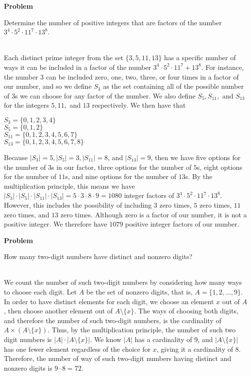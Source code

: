 \documentclass[12pt]{article}
\newcounter{problem}[section]
\newenvironment{problem}[1][]
{\refstepcounter{problem}\noindent\textbf{Problem~\theproblem #1}\vspace{0.2cm}\\\begin{lrbox}{\mybox}\begin{minipage}{\textwidth}}
{\end{minipage}\end{lrbox}\fbox{\usebox{\mybox}}}
\newenvironment{solution}{\vspace{0.1cm}\\}{\vspace{0.5cm}}
\begin{document}
\begin{problem}
    Determine the number of positive integers that are factors of the number $3^4 \cdot 5^2 \cdot 11^7 \cdot 13^8$. 
\end{problem}
\begin{solution}
\noindent Each distinct prime integer from the set $\{3,5,11,13\}$ has a specific number of ways it can be included in a factor of the number $3^4 \cdot 5^2 \cdot 11^7 + 13^8$. For instance, the number $3$ can be included zero, one, two, three, or four times in a factor of our number, and so we define $S_{3}$ as the set containing all of the possible number of $3$s we can choose for any factor of the number. We also define $S_{5}, S_{11},$ and $S_{13}$ for the integers $5, 11,$ and $13$ respectively. We then have that
\begin{center}
    $S_{3} = \{0,1,2,3,4\}$\\
    $S_{5} = \{0,1,2\}$\\
    $S_{11} = \{0,1,2,3,4,5,6,7\}$\\
    $S_{13} = \{0,1,2,3,4,5,6,7,8\}$
\end{center}
\noindent Because $|S_{3}| = 5, |S_{5}|=3, |S_{11}| = 8$, and $|S_{13}| = 9$, then we have five options for the number of $3$s in our factor, three options for the number of $5$s, eight options for the number of $11$s, and nine options for the number of $13$s. By the multiplication principle, this means we have $|S_{3}|\cdot |S_{5}| \cdot |S_{11}| \cdot |S_{13}| = 5 \cdot 3 \cdot 8 \cdot 9 = 1080$ integer factors of $3^4 \cdot 5^2 \cdot 11^7 \cdot 13^8$.\\

\noindent However, this includes the possibility of including $3$ zero times, $5$ zero times, $11$ zero times, and $13$ zero times. Although zero is a factor of our number, it is not a positive integer. We therefore have $1079$ positive integer factors of our number.  
\end{solution}

\begin{problem}
    How many two-digit numbers have distinct and nonzero digits?
\end{problem}
\begin{solution}
    We count the number of such two-digit numbers by considering how many ways to choose each digit. Let $A$ be the set of nonzero digits, that is, $A=\{1,2,\dots,9\}$. In order to have distinct elements for each digit, we choose an element $x$ out of $A$, then choose another element out of $A\setminus \{x\}$. The ways of choosing both digits, and therefore the number of such two-digit numbers, is the cardinality of $A \times (A\setminus \{x\})$. Thus, by the multiplication principle, the number of such two digit numbers is $|A|\cdot |A\setminus \{x\}|$. We know $|A|$ has a cardinality of 9, and $|A\setminus \{x\}|$ has one fewer element regardless of the choice for $x$, giving it a cardinality of 8. Therefore, the number of way of such two-digit numbers having distinct and nonzero digits is $9\cdot 8=72$.
\end{solution}
\end{document}

